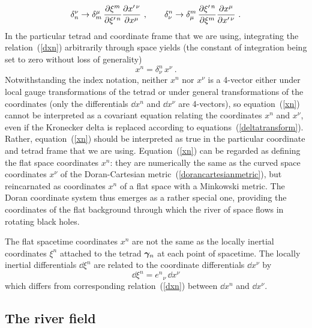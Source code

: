 \documentclass[twocolumn,showpacs,preprintnumbers,amsmath,amssymb,prb]{revtex4}
\begin{document}
\begin{equation}
\label{deltatransform}
  \delta_n^\nu \rightarrow
  \delta_m^\mu
  \,
  {\partial \xi^m \over \partial \xi^{\prime \, n}}
  {\partial x^{\prime \, \nu} \over \partial x^\mu}
  \ ,
  \qquad
  \delta_\nu^n \rightarrow
  \delta_\mu^m
  \,
  {\partial \xi^{\prime \, n} \over \partial \xi^m}
  {\partial x^\mu \over \partial x^{\prime \, \nu}}
  \ .
\end{equation}
In the particular tetrad and coordinate frame that we are using,
integrating the relation~(\ref{dxn}) arbitrarily through space yields
(the constant of integration being set to zero without loss of generality)
\begin{equation}
\label{xn}
  x^n = \delta_\nu^n \, x^\nu
  \ .
\end{equation}
Notwithstanding the index notation,
neither $x^n$ nor $x^\nu$ is a 4-vector
either under
local gauge transformations of the tetrad
or under
general transformations of the coordinates
(only the differentials $\dd x^n$ and $\dd x^\nu$ are 4-vectors),
so equation~(\ref{xn})
cannot be interpreted as a covariant equation relating
the coordinates $x^n$ and $x^\nu$,
even if the Kronecker delta is replaced according to
equations~(\ref{deltatransform}).
Rather, equation~(\ref{xn}) should be interpreted as true
in the particular coordinate and tetrad frame that we are using.
Equation~(\ref{xn})
can be regarded as defining the flat space coordinates $x^n$:
they are numerically the same as the curved space coordinates $x^\nu$
of the Doran-Cartesian metric~(\ref{dorancartesianmetric}),
but reincarnated as coordinates $x^n$
of a flat space with a Minkowski metric.
The Doran \cite{Doran} coordinate system
thus emerges as a rather special one,
providing the coordinates of the flat background
through which the river of space flows in rotating black holes.

The flat spacetime coordinates $x^n$
are not the same as the locally inertial coordinates $\xi^n$
attached to the tetrad $\bm{\gamma}_n$ at each point of spacetime.
The locally inertial differentials $\dd\xi^n$
are related to the coordinate differentials $\dd x^\nu$ by
\begin{equation}
  \dd\xi^n = {e^n}_\nu \, \dd x^\nu
\end{equation}
which differs from corresponding relation~(\ref{dxn}) between
$\dd x^n$ and
$\dd x^\nu$.

\subsection{The river field}
\label{riverfield}
\end{document}
